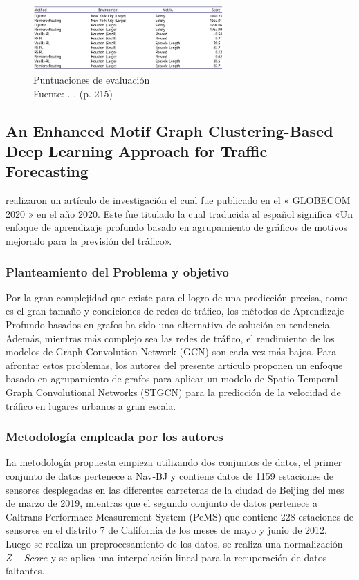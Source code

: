 \begin{figure}[h]
	\begin{center}
		\includegraphics[width=0.65\textwidth]{2/figures/resultN.jpg}
		\caption{Puntuaciones de evaluación \\
			Fuente: \citep*{pr_de}. . (p. 215)}
		\label{1:fig2}
	\end{center}
\end{figure}


\subsection{An Enhanced Motif Graph Clustering-Based Deep Learning Approach for Traffic Forecasting \citep*{pr_zhang}}
\citeauthor{pr_zhang} realizaron un artículo de investigación el cual fue publicado en el « GLOBECOM 2020 » en el año 2020. Este fue titulado  la cual traducida al español significa «Un enfoque de aprendizaje profundo basado en agrupamiento de gráficos de motivos mejorado para la previsión del tráfico».

\subsubsection{Planteamiento del Problema y objetivo }
Por la gran complejidad que existe para el logro de una predicción precisa, como es el gran tamaño y condiciones de redes de tráfico, los métodos de Aprendizaje Profundo basados en grafos ha sido una alternativa de solución en tendencia. Además, mientras más complejo sea las redes de tráfico, el rendimiento de los modelos de Graph Convolution Network (GCN) son cada vez más bajos. Para afrontar estos problemas, los autores del presente artículo proponen un enfoque basado en agrupamiento de grafos para aplicar un modelo de Spatio-Temporal Graph Convolutional Networks (STGCN) para la predicción de la velocidad de tráfico en lugares urbanos a gran escala.

\subsubsection{Metodología empleada por los autores}
La metodología propuesta empieza utilizando dos conjuntos de datos, el primer conjunto de datos pertenece a Nav-BJ y contiene datos de 1159 estaciones de sensores desplegadas en las diferentes carreteras de la ciudad de Beijing del mes de marzo de 2019, mientras que el segundo conjunto de datos pertenece a Caltrans Performace Measurement System (PeMS) que contiene 228 estaciones de sensores en el distrito 7 de California de los meses de mayo y junio de 2012. Luego se realiza un preprocesamiento de los datos, se realiza una normalización $Z-Score$ y se aplica una interpolación lineal para la recuperación de datos faltantes. 

